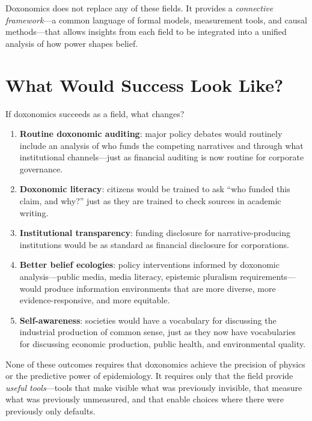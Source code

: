 Doxonomics does not replace any of these fields.
It provides a \emph{connective framework}---a common language of formal models, measurement tools, and causal methods---that allows insights from each field to be integrated into a unified analysis of how power shapes belief.

\section{What Would Success Look Like?}
\label{sec:ch35-success}

If doxonomics succeeds as a field, what changes?

\begin{enumerate}
  \item \textbf{Routine doxonomic auditing}: major policy debates would routinely include an analysis of who funds the competing narratives and through what institutional channels---just as financial auditing is now routine for corporate governance.

  \item \textbf{Doxonomic literacy}: citizens would be trained to ask ``who funded this claim, and why?'' just as they are trained to check sources in academic writing.

  \item \textbf{Institutional transparency}: funding disclosure for narrative-producing institutions would be as standard as financial disclosure for corporations.

  \item \textbf{Better belief ecologies}: policy interventions informed by doxonomic analysis---public media, media literacy, epistemic pluralism requirements---would produce information environments that are more diverse, more evidence-responsive, and more equitable.

  \item \textbf{Self-awareness}: societies would have a vocabulary for discussing the industrial production of common sense, just as they now have vocabularies for discussing economic production, public health, and environmental quality.
\end{enumerate}

None of these outcomes requires that doxonomics achieve the precision of physics or the predictive power of epidemiology.
It requires only that the field provide \emph{useful tools}---tools that make visible what was previously invisible, that measure what was previously unmeasured, and that enable choices where there were previously only defaults.

